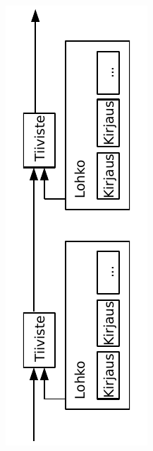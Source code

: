 \documentclass{article}
\begin{document}
\begin{figure}[H]
    \centering
    \includegraphics[angle=270,width=\textwidth]{figures/fig2.pdf}
\end{figure}
\end{document}
